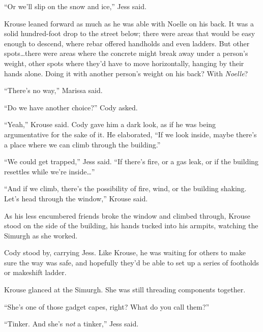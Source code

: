 ``Or we'll slip on the snow and ice,'' Jess said.



Krouse leaned forward as much as he was able with Noelle on his back.  It was a solid hundred-foot drop to the street below; there were areas that would be easy enough to descend, where rebar offered handholds and even ladders.  But other spots\ldots there were areas where the concrete might break away under a person's weight, other spots where they'd have to move horizontally, hanging by their hands alone.  Doing it with another person's weight on his back?  With \emph{Noelle}?



``There's no way,'' Marissa said.



``Do we have another choice?''  Cody asked.



``Yeah,'' Krouse said.  Cody gave him a dark look, as if he was being argumentative for the sake of it.  He elaborated, ``If we look inside, maybe there's a place where we can climb through the building.''



``We could get trapped,'' Jess said.  ``If there's fire, or a gas leak, or if the building resettles while we're inside\ldots''



``And if we climb, there's the possibility of fire, wind, or the building shaking.  Let's head through the window,'' Krouse said.



As his less encumbered friends broke the window and climbed through, Krouse stood on the side of the building, his hands tucked into his armpits, watching the Simurgh as she worked.



Cody stood by, carrying Jess.  Like Krouse, he was waiting for others to make sure the way was safe, and hopefully they'd be able to set up a series of footholds or makeshift ladder.



Krouse glanced at the Simurgh.  She was still threading components together.



``She's one of those gadget capes, right?  What do you call them?''



``Tinker.  And she's \emph{not} a tinker,'' Jess said.



